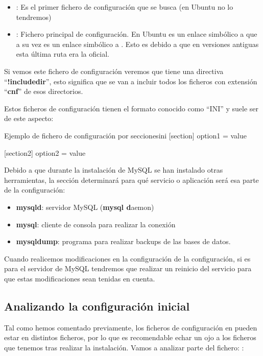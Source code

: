 \begin{itemize}
    \item {}: Es el primer fichero de configuración que se busca (en Ubuntu no lo tendremos)
    \item {} : Fichero principal de configuración. En Ubuntu es un enlace simbólico a    que a su vez es un enlace simbólico a . Esto es debido a que en versiones antiguas esta última ruta era la oficial.
\end{itemize}

Si vemos este fichero de configuración veremos que tiene una directiva “\textbf{!includedir}”, esto significa que se van a incluir todos los ficheros con extensión “\textbf{cnf}” de esos directorios.

Estos ficheros de configuración tienen el formato conocido como “INI” y suele ser de este aspecto:

\begin{mycode}{Ejemplo de fichero de configuración por secciones}{ini}{}
[section]
option1    = value

[section2]
option2     = value
\end{mycode}

Debido a que durante la instalación de MySQL se han instalado otras herramientas, la sección determinará para qué servicio o aplicación será esa parte de la configuración:

\begin{itemize}
    \item \textbf{mysqld}:  servidor MySQL (\textbf{mysql d}aemon)
    \item \textbf{mysql}: cliente de consola para realizar la conexión
    \item \textbf{mysqldump}: programa para realizar backups de las bases de datos.
\end{itemize}

Cuando realicemos modificaciones en la configuración de la configuración, si es para el servidor de MySQL tendremos que realizar un reinicio del servicio para que estas modificaciones sean tenidas en cuenta.

\subsection{Analizando la configuración inicial}
Tal como hemos comentado previamente, los ficheros de configuración en  pueden estar en distintos ficheros, por lo que es recomendable echar un ojo a los ficheros que tenemos tras realizar la instalación. Vamos a analizar parte del fichero: :



